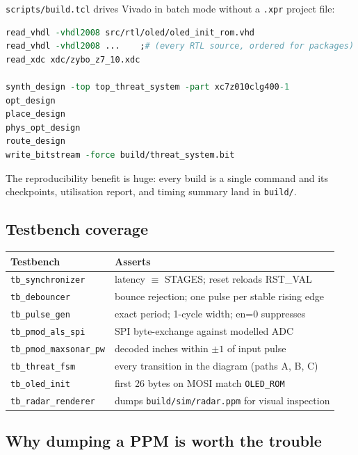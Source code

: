 \documentclass[11pt,a4paper]{article}
\begin{document}
\texttt{scripts/build.tcl} drives Vivado in batch mode without a
\texttt{.xpr} project file:

\begin{lstlisting}[language=tcl, caption={Skeleton of \texttt{build.tcl}.}]
read_vhdl -vhdl2008 src/rtl/oled/oled_init_rom.vhd
read_vhdl -vhdl2008 ...    ;# (every RTL source, ordered for packages)
read_xdc xdc/zybo_z7_10.xdc

synth_design -top top_threat_system -part xc7z010clg400-1
opt_design
place_design
phys_opt_design
route_design
write_bitstream -force build/threat_system.bit
\end{lstlisting}

The reproducibility benefit is huge: every build is a single command and
its checkpoints, utilisation report, and timing summary land in
\texttt{build/}.

\subsection{Testbench coverage}

\begin{table}[h]
\centering
\begin{tabular}{@{}ll@{}}
\toprule
Testbench & Asserts \\
\midrule
\texttt{tb\_synchronizer}     & latency $\equiv$ STAGES; reset reloads RST\_VAL \\
\texttt{tb\_debouncer}        & bounce rejection; one pulse per stable rising edge \\
\texttt{tb\_pulse\_gen}       & exact period; 1-cycle width; en=0 suppresses \\
\texttt{tb\_pmod\_als\_spi}   & SPI byte-exchange against modelled ADC \\
\texttt{tb\_pmod\_maxsonar\_pw} & decoded inches within $\pm 1$ of input pulse \\
\texttt{tb\_threat\_fsm}      & every transition in the diagram (paths A, B, C) \\
\texttt{tb\_oled\_init}       & first 26 bytes on MOSI match \texttt{OLED\_ROM} \\
\texttt{tb\_radar\_renderer}  & dumps \texttt{build/sim/radar.ppm} for visual inspection \\
\bottomrule
\end{tabular}
\end{table}

\subsection{Why dumping a PPM is worth the trouble}
\end{document}

